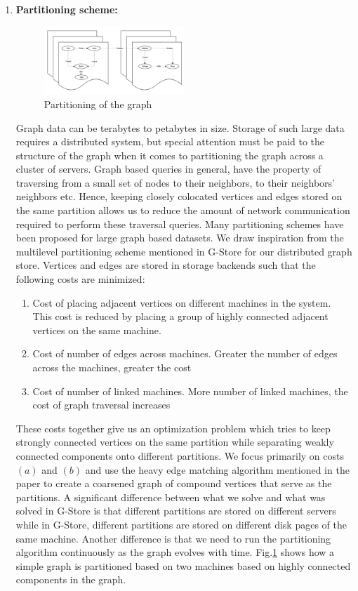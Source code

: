 \documentclass[letterpaper, 11 pt, conference]{ieeeconf}  %
\begin{document}
\begin{enumerate}
 \item \textbf{Partitioning scheme: }
 \begin{figure}
 \centering
  \includegraphics[width=0.5\textwidth]{replicas.png}
\caption{Partitioning of the graph}
\label{fig:rep}
\end{figure}
Graph data can be terabytes to petabytes in size. Storage of such large data requires a distributed system, but special attention must be paid to the structure of the graph when it comes to partitioning the graph across a cluster of servers. Graph based queries in general, have the property of traversing from a small set of nodes to their neighbors, to their neighbors’ neighbors etc. Hence, keeping closely colocated vertices and edges stored on the same partition allows us to reduce the amount of network communication required to perform these traversal queries. Many partitioning schemes have been proposed for large graph based datasets. We draw inspiration from the multilevel partitioning scheme mentioned in G-Store\cite{g-store} for our distributed graph store. Vertices and edges are stored in storage backends such that the following costs are minimized:
\begin{enumerate}
\item Cost of placing adjacent vertices on different machines in the system. This cost is reduced by placing a group of highly connected adjacent vertices on the same machine.
\item Cost of number of edges across machines. Greater the number of edges across the machines, greater the cost
\item Cost of number of linked machines. More number of linked machines, the cost of graph traversal increases
\end{enumerate}
These costs together give us an optimization problem which tries to keep strongly connected vertices on the same partition while separating weakly connected components onto different partitions. We focus primarily on costs $(a)$ and $(b)$ and use the heavy edge matching algorithm mentioned in the paper to create a coarsened graph of compound vertices that serve as the partitions. A significant difference between what we solve and what was solved in G-Store is that different partitions are stored on different servers while in G-Store, different partitions are stored on different disk pages of the same machine. Another difference is that we need to run the partitioning algorithm continuously as the graph evolves with time. Fig.\ref{fig:rep} shows how a simple graph is partitioned based on two machines based on highly connected components in the graph. 

\end{enumerate}
\end{document}

